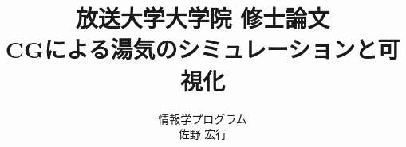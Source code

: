 \usepackage[dvipdfmx]{graphicx}
\usepackage[margin=30mm]{geometry}
\usepackage{url}
\usepackage{amsmath}
\usepackage[subrefformat=parens]{subcaption}

\pagestyle{plain}


\title{放送大学大学院 修士論文 \\ CGによる湯気のシミュレーションと可視化}
\author{情報学プログラム\\ 佐野 宏行}
\maketitle
\tableofcontents
\newpage
